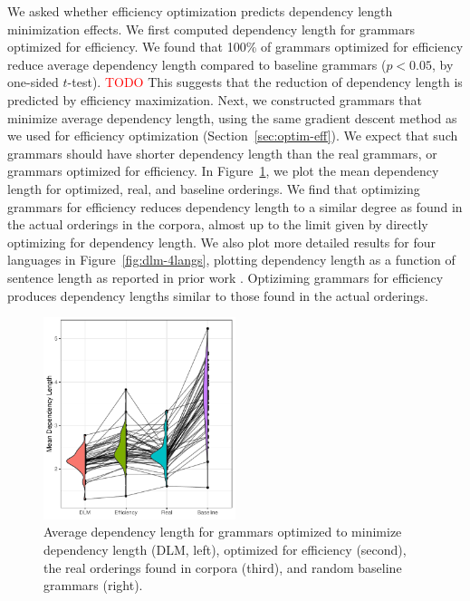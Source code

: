 \documentclass[10pt,twoside,lineno]{article}
\begin{document}
We asked whether efficiency optimization predicts dependency length minimization effects.
We first computed dependency length for grammars optimized for efficiency.
We found that 100\% of grammars optimized for efficiency reduce average dependency length compared to baseline grammars ($p < 0.05$, by one-sided $t$-test). \textcolor{red}{TODO}
This suggests that the reduction of dependency length is predicted by efficiency maximization.
Next, we constructed grammars that minimize average dependency length, using the same gradient descent method as we used for efficiency optimization (Section~\ref{sec:optim-eff}).
We expect that such grammars should have shorter dependency length than the real grammars, or grammars optimized for efficiency.
In Figure~\ref{fig:dlm-avg}, we plot the mean dependency length for optimized, real, and baseline orderings.
We find that optimizing grammars for efficiency reduces dependency length to a similar degree as found in the actual orderings in the corpora, almost up to the limit given by directly optimizing for dependency length.
We also plot more detailed results for four languages in Figure~\ref{fig:dlm-4langs}, plotting dependency length as a function of sentence length as reported in prior work \cite{futrell2015largescale}.
Optiziming grammars for efficiency produces dependency lengths similar to those found in the actual orderings.

\begin{figure}[ht]
    \centering
     \includegraphics[width=0.5\textwidth]{../results/dependency-length/figures/depl-violin-all.pdf} 
        \caption{Average dependency length for grammars optimized to minimize dependency length (DLM, left), optimized for efficiency (second), the real orderings found in corpora (third), and random baseline grammars (right).}
    \label{fig:dlm-avg}
\end{figure}
\end{document}
